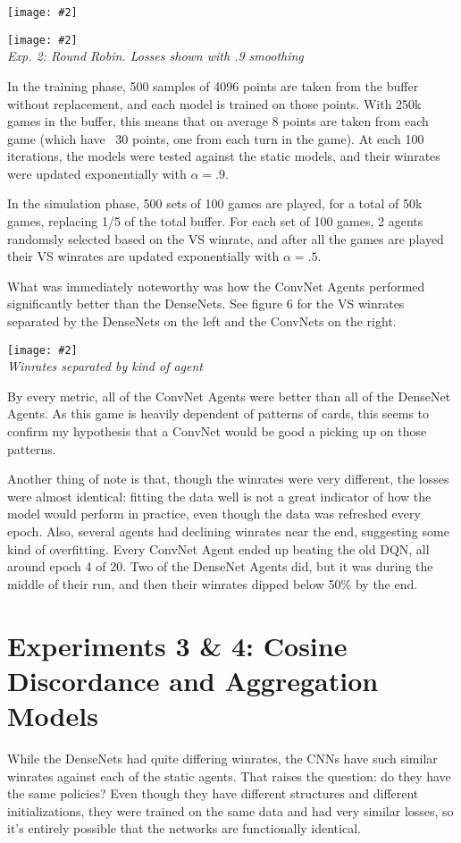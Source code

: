\documentclass{article}
\newcommand{\pic}[3]{
\begin{center}
\texttt{[image: \#2]}\\
\small\textit{#3}
\end{center}
}
\begin{document}
\pic{1.1}{Alg1.png}{}

\pic{.4}{Exp2.png}{Exp. 2: Round Robin. Losses shown with .9 smoothing}


In the training phase, 500 samples of 4096 points are taken from the buffer without replacement, and each model is trained on those points. With 250k games in the buffer, this means that on average 8 points are taken from each game (which have ~30 points, one from each turn in the game). At each 100 iterations, the models were tested against the static models, and their winrates were updated exponentially with $\alpha = .9$.

In the simulation phase, 500 sets of 100 games are played, for a total of 50k games, replacing 1/5 of the total buffer. For each set of 100 games, 2 agents randomsly selected based on the VS winrate, and after all the games are played their VS winrates are updated exponentially with $\alpha = .5$. 


What was immediately noteworthy was how the ConvNet Agents performed significantly better than the DenseNets. See figure 6 for the VS winrates separated by the DenseNets on the left and the ConvNets on the right.

\pic{.4}{Exp22.png}{Winrates separated by kind of agent}

By every metric, all of the ConvNet Agents were better than all of the DenseNet Agents. As this game is heavily dependent of patterns of cards, this seems to confirm my hypothesis that a ConvNet would be good a picking up on those patterns. 

Another thing of note is that, though the winrates were very different, the losses were almost identical: fitting the data well is not a great indicator of how the model would perform in practice, even though the data was refreshed every epoch. Also, several agents had declining winrates near the end, suggesting some kind of overfitting. Every ConvNet Agent ended up beating the old DQN, all around epoch 4 of 20. Two of the DenseNet Agents did, but it was during the middle of their run, and then their winrates dipped below 50\% by the end.


\section{Experiments 3 \& 4: Cosine Discordance and Aggregation Models}
While the DenseNets had quite differing winrates, the CNNs have such similar winrates against each of the static agents. That raises the question: do they have the same policies? Even though they have different structures and different initializations, they were trained on the same data and had very similar losses, so it's entirely possible that the networks are functionally identical. 
\end{document}
